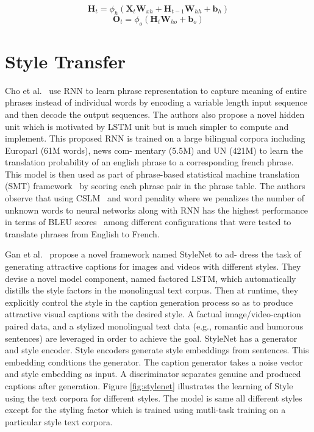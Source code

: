 \documentclass[akbc,twoside,11pt]{article}
\begin{document}
\begin{equation}
\label{eq:not}
    \mathbf{H}_{t}=\phi_h\left(\mathbf{X}_{t} \mathbf{W}_{x h}+\mathbf{H}_{t-1} \mathbf{W}_{h h}+\mathbf{b}_{h}\right)
\end{equation}
\begin{equation}
\label{eq:outrnn}
    \mathbf{O}_{t}=\phi_o\left(\mathbf{H}_{t} \mathbf{W}_{h o}+\mathbf{b}_{o}\right)
\end{equation}

\section{Style Transfer}

Cho et al.~\cite{cho2014learning} use RNN to learn phrase representation to capture meaning of entire phrases instead of individual words by encoding a variable length input sequence and then decode the output sequences. The authors also propose a novel hidden unit which is motivated by LSTM unit but is much simpler to compute and implement. This proposed RNN is trained on a large bilingual corpora including Europarl (61M words), news com- mentary (5.5M) and UN (421M) to learn the translation probability of an english phrase to a corresponding french phrase. This model is then used as part of phrase-based statistical machine translation (SMT) framework~\cite{koehn-2005-europarl,marcu-wong-2002-phrase} by scoring each phrase pair in the phrase table. The authors observe that using CSLM~\cite{SCHWENK2007492} and word penality where we penalizes the number of unknown words to neural networks along with RNN has the highest performance in terms of BLEU scores~\cite{papineni2002bleu} among different configurations that were tested to translate phrases from English to French.

Gan et al.~\cite{gan2017stylenet} propose a novel framework named StyleNet to ad- dress the task of generating attractive captions for images and videos with different styles. They devise a novel model component, named factored LSTM, which automatically distills the style factors in the monolingual text corpus. Then at runtime, they explicitly control the style in the caption generation process so as to produce attractive visual captions with the desired style. A factual image/video-caption paired data, and a stylized monolingual text data (e.g., romantic and humorous sentences) are leveraged in order to achieve the goal. StyleNet has a generator and style encoder. Style encoders generate style embeddings from sentences. This embedding conditions the generator. The caption generator takes a noise vector and style embedding as input. A discriminator separates genuine and produced captions after generation. Figure \ref{fig:stylenet} illustrates the learning of Style using the text corpora for different styles. The model is same all different styles except for the styling factor which is trained using mutli-task training on a particular style text corpora.
\end{document}
